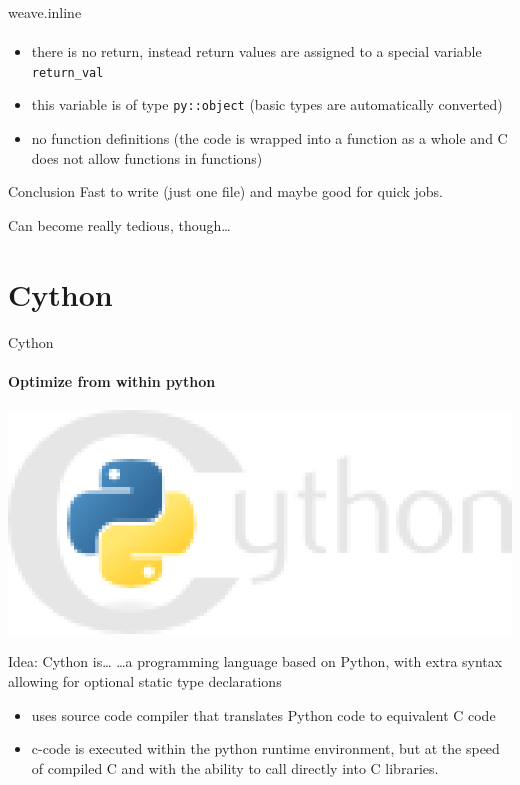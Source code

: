 \documentclass[german]{beamer}
\begin{document}
\begin{frame}[fragile]{weave.inline}
  \framesubtitle{}
  \begin{itemize}
  \item there is no return, instead return values are assigned to a
    special variable {\tt return\_val}
  \item this variable is of type {\tt py::object} (basic types are
    automatically converted)
  \item no function definitions (the code is wrapped into a function
    as a whole and C does not allow functions in functions)
  \end{itemize}

  \begin{block}{Conclusion}
    Fast to write (just one file) and maybe good for quick
    jobs.

    Can become really tedious, though\ldots
  \end{block}
\end{frame}

\section{Cython}
\begin{frame}[fragile]{Cython}
  \framesubtitle{Optimize from within python}
  \includegraphics[width=.3\textwidth]{pics/cython}
  \begin{block}{Idea: Cython is\ldots}
    \ldots a programming language based on Python, with extra syntax
    allowing for optional static type
    declarations
  \end{block}
  \begin{itemize}
  \item uses source code compiler that translates Python code to
    equivalent C code
  \item c-code is executed within the python runtime environment, but
    at the speed of compiled C and with the ability to call directly
    into C libraries.
  \end{itemize}
\end{frame}
\end{document}
